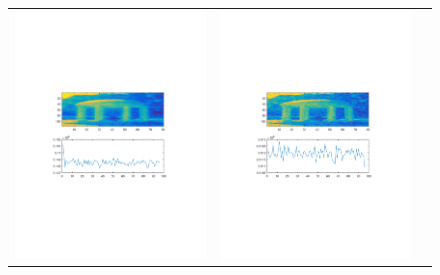 \documentclass{article}
\begin{document}
\begin{figure}
\begin{tabular}{ccc}
\includegraphics[scale=0.25]{100iter.pdf}
&
\includegraphics[scale=0.25]{100iterrescale.pdf}

\end{tabular}
\end{figure}
\end{document}
